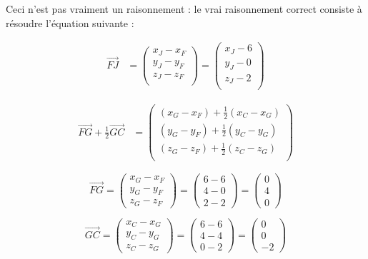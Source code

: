 \documentclass{exam}
\begin{document}
\begin{questions}
    Ceci n'est pas vraiment un raisonnement : le vrai raisonnement correct consiste à résoudre l'équation suivante : 

    \begin{align*}
    \overrightarrow{FJ} &=  \begin{pmatrix}
      x_{J} - x_{F} \\
      y_{J} - y_{F} \\ 
      z_{J} - z_{F} \\
    \end{pmatrix} = \begin{pmatrix}
      x_{J} - 6 \\
      y_{J} - 0 \\ 
      z_{J} - 2 \\
    \end{pmatrix}
  \end{align*}

  \begin{align*}
    \overrightarrow{FG} + \frac{1}{2} \overrightarrow{GC} &=  \begin{pmatrix}
      (x_{G} - x_{F}) + \frac{1}{2} (x_{C} - x_{G}) \\
      (y_{G} - y_{F}) + \frac{1}{2} (y_{C} - y_{G}) \\ 
      (z_{G} - z_{F}) + \frac{1}{2} (z_{C} - z_{G}) \\
    \end{pmatrix} 
  \end{align*}

    \[
\overrightarrow{FG} = 
\begin{pmatrix}
x_G - x_F \\
y_G - y_F \\
z_G - z_F
\end{pmatrix}
=
\begin{pmatrix}
6 - 6 \\
4 - 0 \\
2 - 2
\end{pmatrix}
=
\begin{pmatrix}
0 \\
4 \\
0
\end{pmatrix}
\]


\[
\overrightarrow{GC} = 
\begin{pmatrix}
x_C - x_G \\
y_C - y_G \\
z_C - z_G
\end{pmatrix}
=
\begin{pmatrix}
6 - 6 \\
4 - 4 \\
0 - 2
\end{pmatrix}
=
\begin{pmatrix}
0 \\
0 \\
-2
\end{pmatrix}
\]


\end{questions}
\end{document}
